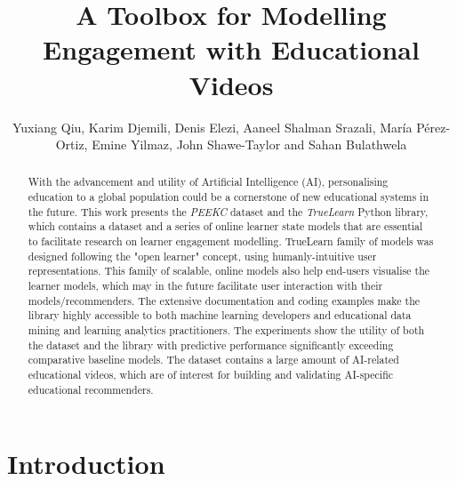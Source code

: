 \documentclass[letterpaper]{article} %
\title{A Toolbox for Modelling Engagement with Educational Videos}
\author{
Yuxiang Qiu\equalcontrib,
Karim Djemili\equalcontrib,
Denis Elezi\equalcontrib,
Aaneel Shalman Srazali\equalcontrib,
Mar\'ia P\'erez-Ortiz, 
Emine Yilmaz, 
John Shawe-Taylor and
Sahan Bulathwela
}
\begin{document}
\maketitle

\begin{abstract}
With the advancement and utility of Artificial Intelligence (AI), personalising education to a global population could be a cornerstone of new educational systems in the future. This work presents the \emph{PEEKC} dataset and the \emph{TrueLearn} Python library, which contains a dataset and a series of online learner state models that are essential to facilitate research on learner engagement modelling. %
TrueLearn family of models was designed following the "open learner" concept, using humanly-intuitive user representations. 
This family of scalable, online models also help  
end-users visualise the learner models, which may in the future facilitate user interaction with their models/recommenders.
The extensive documentation and coding examples make the library highly accessible to both machine learning developers and educational data mining and learning analytics practitioners.  
The experiments show the utility of both the dataset and the library with predictive performance significantly exceeding comparative baseline models. The dataset contains a large amount of AI-related educational videos, which are of interest for building and validating AI-specific educational recommenders.
\end{abstract}

\section{Introduction}
\end{document}

